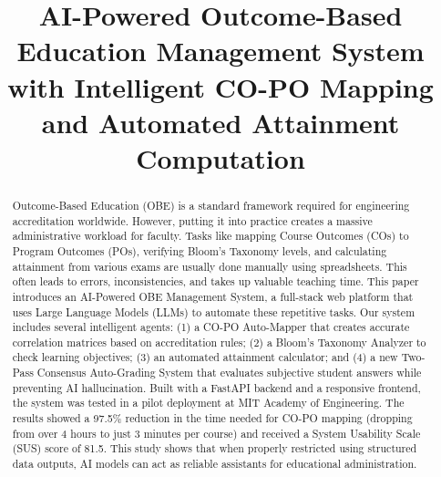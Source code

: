 \documentclass[conference]{IEEEtran}
\begin{document}
\title{AI-Powered Outcome-Based Education Management System with Intelligent CO-PO Mapping and Automated Attainment Computation\\
}

\author{
\and
{}
\and
{}
}

\maketitle

\begin{abstract}
Outcome-Based Education (OBE) is a standard framework required for engineering accreditation worldwide. However, putting it into practice creates a massive administrative workload for faculty. Tasks like mapping Course Outcomes (COs) to Program Outcomes (POs), verifying Bloom’s Taxonomy levels, and calculating attainment from various exams are usually done manually using spreadsheets. This often leads to errors, inconsistencies, and takes up valuable teaching time. This paper introduces an AI-Powered OBE Management System, a full-stack web platform that uses Large Language Models (LLMs) to automate these repetitive tasks. Our system includes several intelligent agents: (1) a CO-PO Auto-Mapper that creates accurate correlation matrices based on accreditation rules; (2) a Bloom’s Taxonomy Analyzer to check learning objectives; (3) an automated attainment calculator; and (4) a new Two-Pass Consensus Auto-Grading System that evaluates subjective student answers while preventing AI hallucination. Built with a FastAPI backend and a responsive frontend, the system was tested in a pilot deployment at MIT Academy of Engineering. The results showed a 97.5\% reduction in the time needed for CO-PO mapping (dropping from over 4 hours to just 3 minutes per course) and received a System Usability Scale (SUS) score of 81.5. This study shows that when properly restricted using structured data outputs, AI models can act as reliable assistants for educational administration.
\end{abstract}
\end{document}
